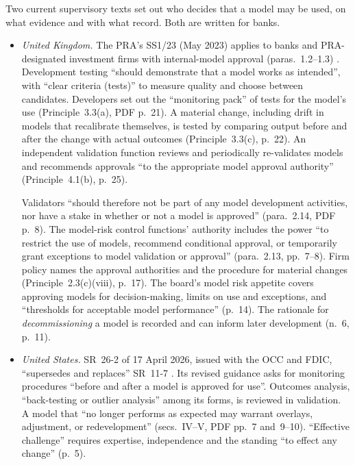 \begin{qfmethod}\label{meth:strategy-promotion-criteria}
 Two current supervisory texts set out who decides that a model may be used, on what evidence and with what record. Both are written for banks.
\begin{itemize}
\item \emph{United Kingdom.} The PRA's SS1/23 (May 2023) applies to banks and PRA-designated investment firms with internal-model approval (paras.~1.2--1.3) \citep[para.~1.2, PDF p.~3]{wide-pra-ss123}. Development testing ``should demonstrate that a model works as intended'', with ``clear criteria (tests)'' to measure quality and choose between candidates. Developers set out the ``monitoring pack'' of tests for the model's use (Principle~3.3(a), PDF p.~21). A material change, including drift in models that recalibrate themselves, is tested by comparing output before and after the change with actual outcomes (Principle~3.3(c), p.~22). An independent validation function reviews and periodically re-validates models and recommends approvals ``to the appropriate model approval authority'' (Principle~4.1(b), p.~25).

Validators ``should therefore not be part of any model development activities, nor have a stake in whether or not a model is approved'' (para.~2.14, PDF p.~8). The model-risk control functions' authority includes the power ``to restrict the use of models, recommend conditional approval, or temporarily grant exceptions to model validation or approval'' (para.~2.13, pp.~7--8). Firm policy names the approval authorities and the procedure for material changes (Principle~2.3(c)(viii), p.~17). The board's model risk appetite covers approving models for decision-making, limits on use and exceptions, and ``thresholds for acceptable model performance'' (p.~14). The rationale for \emph{decommissioning} a model is recorded and can inform later development (n.~6, p.~11).
\item \emph{United States.} SR~26-2 of 17 April 2026, issued with the OCC and FDIC, ``supersedes and replaces'' SR~11-7 \citep[cover letter]{sr-26-2-2026}. Its revised guidance asks for monitoring procedures ``before and after a model is approved for use''. Outcomes analysis, ``back-testing or outlier analysis'' among its forms, is reviewed in validation. A model that ``no longer performs as expected may warrant overlays, adjustment, or redevelopment'' (secs.~IV--V, PDF pp.~7 and~9--10). ``Effective challenge'' requires expertise, independence and the standing ``to effect any change'' (p.~5).
\end{itemize}


\end{qfmethod}
